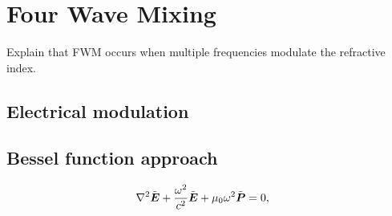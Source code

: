 \chapter{Four Wave Mixing}
\label{ch:FWM}

Explain that FWM occurs when multiple frequencies modulate the refractive index. 




\section{Electrical modulation}

\section{Bessel function approach}





\begin{align}
    \nabla^{2}\tilde{\boldsymbol{E}}+\frac{\omega^{2}}{c^{2}}\tilde{\boldsymbol{E}}+\text{\ensuremath{\mu_{0}}}\omega^{2}\tilde{\boldsymbol{P}}&=0,
\end{align}